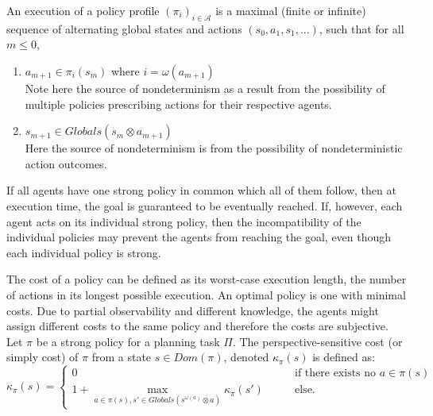 An execution of a policy profile $(\pi_i)_{i \in \mathcal{A}}$ is a maximal (finite or infinite) sequence of alternating global states and actions $(s_0, a_1, s_1,...)$, such that for all $m \leq 0$,
\begin{enumerate}
  \item $a_{m+1} \in \pi_i(s_m)$ where $i=\omega(a_{m+1})$ \\
    Note here the source of nondeterminism as a result from the possibility of multiple policies prescribing actions for their respective agents.
  \item $s_{m+1} \in Globals(s_m \otimes a_{m+1}) $ \\
    Here the source of nondeterminism is from the possibility of nondeterministic action outcomes.
\end{enumerate}


If all agents have one strong policy in common which all of them follow, then at execution time, the goal is guaranteed to be eventually reached. If, however, each agent acts on its individual strong policy, then the incompatibility of the individual policies may prevent the agents from reaching the goal, even though each individual policy is strong.



The cost of a policy can be defined as its worst-case execution length, the number of actions in its longest possible execution. An optimal policy is one with minimal costs. Due to partial observability and different knowledge, the agents might assign different costs to the same policy and therefore the costs are subjective. \\
Let $\pi$ be a strong policy for a planning task $\Pi$. The perspective-sensitive cost (or simply cost) of $\pi$ from a state $s\in Dom(\pi)$, denoted $\kappa_{\pi}(s)$ is defined as:
$$\kappa_{\pi}(s) =
\begin{cases}
0 \qquad & \text{if there exists no } a \in \pi(s)\\
1+ \max_{a\in \pi(s), s'\in Globals(s^{\omega(a)} \otimes a)} \kappa_{\pi}(s') \qquad & \text{else.}
\end{cases}$$
